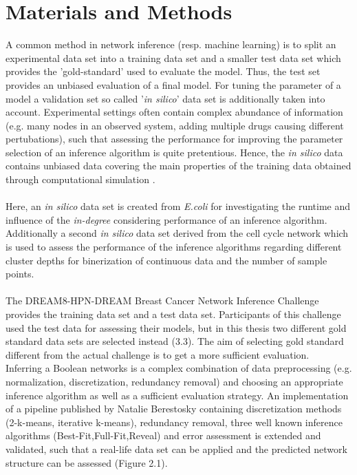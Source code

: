 \chapter{Materials and Methods}
A common method in network inference (resp. machine learning) is to split an experimental data set into a training data set and a smaller test data set which provides the 'gold-standard' used to evaluate the model. Thus, the test set provides an unbiased evaluation of a final model.
For tuning the parameter of a model a validation set so called '\textit{in silico}' data set is additionally taken into account. Experimental settings often contain complex abundance of information (e.g. many nodes in an observed system, adding multiple drugs causing different pertubations), such that assessing the performance for improving the parameter selection of an inference algorithm is quite pretentious. Hence, the \textit{in silico} data contains unbiased data covering the main properties of the training data obtained through computational simulation \citep{WarrenS.Sarle.17.05.2002}. %
\\\\
Here, an \textit{in silico} data set is created from \textit{E.coli} for investigating the runtime and influence of the \textit{in-degree} considering performance of an inference algorithm. Additionally a second \textit{in silico} data set derived from the cell cycle network which is used to assess the performance of the inference algorithms regarding different cluster depths for binerization of continuous data and the number of sample points. 
\\\\
The DREAM8-HPN-DREAM Breast Cancer Network Inference Challenge provides the training data set and a test data set. Participants of this challenge used the test data for assessing their models, but in this thesis two different gold standard data sets are selected instead (3.3). The aim of selecting gold standard different from the actual challenge is to get a more sufficient evaluation.
\\ 

Inferring a Boolean networks is a complex combination of data preprocessing (e.g. normalization, discretization, redundancy removal) and choosing an appropriate inference algorithm as well as a sufficient evaluation strategy.
An implementation of a pipeline published by Natalie Berestosky \citep{Berestovsky.2013} containing discretization methods (2-k-means, iterative k-means), redundancy removal, three well known inference algorithms (Best-Fit,Full-Fit,Reveal) and error assessment is extended and validated, such that a real-life data set can be applied and the predicted network structure can be assessed (Figure 2.1).

